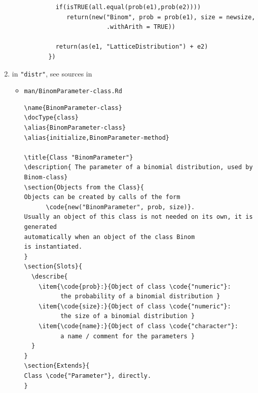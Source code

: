 \documentclass[10pt]{article}
\let\code\lstinline
\def\file#1{{\tt #1}}
\def\pkg#1{{\tt "#1"}}
\begin{document}
\begin{enumerate}
\begin{lstlisting}
            if(isTRUE(all.equal(prob(e1),prob(e2))))    
               return(new("Binom", prob = prob(e1), size = newsize, 
                          .withArith = TRUE))
            
            return(as(e1, "LatticeDistribution") + e2)
          })
\end{lstlisting}
\item in \pkg{distr}, see sources in
%
\begin{itemize}
%
\item\file{man/BinomParameter-class.Rd}
%
\begin{lstlisting}[style=Rdstyle]
\name{BinomParameter-class} 
\docType{class}
\alias{BinomParameter-class}
\alias{initialize,BinomParameter-method}

\title{Class "BinomParameter"}
\description{ The parameter of a binomial distribution, used by Binom-class}
\section{Objects from the Class}{
Objects can be created by calls of the form 
      \code{new("BinomParameter", prob, size)}.
Usually an object of this class is not needed on its own, it is generated 
automatically when an object of the class Binom
is instantiated. 
}
\section{Slots}{
  \describe{
    \item{\code{prob}:}{Object of class \code{"numeric"}: 
          the probability of a binomial distribution }
    \item{\code{size}:}{Object of class \code{"numeric"}: 
          the size of a binomial distribution }
    \item{\code{name}:}{Object of class \code{"character"}: 
          a name / comment for the parameters }
  }
}
\section{Extends}{
Class \code{"Parameter"}, directly.
}

\end{lstlisting}
\end{itemize}
\end{enumerate}
\end{document}
